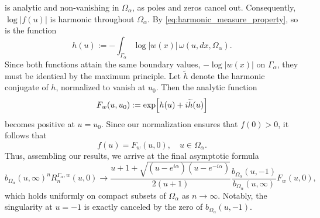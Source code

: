 \documentclass[12pt,oneside,reqno]{amsart}
\theoremstyle{definition}
\numberwithin{equation}{section}
\begin{document}
is analytic and non-vanishing in $\Omega_\alpha$, as poles and zeros cancel out. Consequently, $\log\vert f(u)\vert$ is harmonic throughout $\Omega_\alpha$. By \eqref{eq:harmonic_measure_property}, so is the function
\begin{equation}
\label{hw}
   h(u) := -\int_{\Gamma_\alpha}\log |w(x)|\,\omega(u,dx,\Omega_{\alpha}).
\end{equation}
Since both functions attain the same boundary values, $-\log\vert w(x)\vert$ on $\Gamma_\alpha$, they must be identical by the maximum principle. 
Let $\widetilde{h}$ denote the harmonic conjugate of $h$, normalized to vanish at $u_0$. Then the analytic function
\begin{equation}
\label{eq:outer_function}
   F_w(u, u_0) := \exp \Bigl[ h(u)+i \widetilde{h}(u) \Bigr]
\end{equation}
becomes positive at $u=u_0$. Since our normalization ensures that $f(0)>0$, it follows that 
\begin{equation}
   f(u)=F_w(u, 0), \quad u\in\Omega_\alpha.
\end{equation}    
Thus, assembling our results, we arrive at the final asymptotic formula
\begin{equation}
\label{eq:residual_at_zero_limit}
   b_{\Omega_\alpha}(u,\infty)^n R_{n}^{\Gamma_\alpha,w}(u,0) \longrightarrow  
   \frac{u+1+\sqrt{(u-e^{i\alpha})(u-e^{-i\alpha})}}{2(u+1)}
   \frac{b_{\Omega_\alpha}(u, -1)}{b_{\Omega_\alpha}(u,\infty)} F_w(u, 0),
\end{equation}
which holds uniformly on compact subsets of $\Omega_\alpha$ as $n\to\infty$. Notably, the singularity at $u=-1$ is exactly canceled by the zero of $b_{\Omega_\alpha}(u, -1)$.
\end{document}
